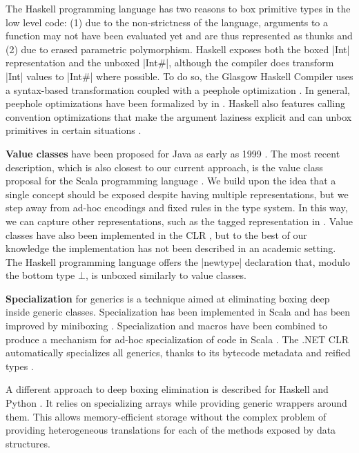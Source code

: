 The Haskell programming language has two reasons to box primitive types in the low level code: (1) due to the non-strictness of the language, arguments to a function may not have been evaluated yet and are thus represented as thunks and (2) due to erased parametric polymorphism. Haskell exposes both the boxed |Int| representation and the unboxed |Int#|, although the compiler does transform |Int| values to |Int#| where possible. To do so, the Glasgow Haskell Compiler uses a syntax-based transformation coupled with a peephole optimization \cite{spj-unboxed-values, launchbury-unpointed}. In general, peephole optimizations have been formalized by  in \cite{henglein-formally-optimal-boxing}. Haskell also features calling convention optimizations that make the argument laziness explicit and can unbox primitives in certain situations \cite{bolingbroke-haskell-calling-conventions}.

\textbf{Value classes} have been proposed for Java as early as 1999 \cite{gosling-value-classes, rose-value-classes-vm, rose-value-classes-tearing}. The most recent description, which is also closest to our current approach, is the value class proposal for the Scala programming language \cite{sip-value-classes}. We build upon the idea that a single concept should be exposed despite having multiple representations, but we step away from ad-hoc encodings and fixed rules in the type system. In this way, we can capture other representations, such as the tagged representation in \cite{morrison-napier88}. Value classes have also been implemented in the CLR \cite{dot-net-value-types-www}, but to the best of our knowledge the implementation has not been described in an academic setting. The Haskell programming language offers the |newtype| declaration \cite{haskell-newtype} that, modulo the bottom type $\bot$, is unboxed similarly to value classes.

\textbf{Specialization} for generics is a technique aimed at eliminating boxing deep inside generic classes. Specialization has been implemented in Scala \cite{iuli-thesis, specialization-iuli} and has been improved by miniboxing \cite{miniboxing, miniboxing-www}. Specialization and macros have been combined to produce a mechanism for ad-hoc specialization of code in Scala \cite{bridging}. The .NET CLR automatically specializes all generics, thanks to its bytecode metadata and reified types \cite{dot-net-generics}.

A different approach to deep boxing elimination is described for Haskell \cite{spj-dph} and Python \cite{bolz-python-strategies}. It relies on specializing arrays while providing generic wrappers around them. This allows memory-efficient storage without the complex problem of providing heterogeneous translations for each of the methods exposed by data structures.

